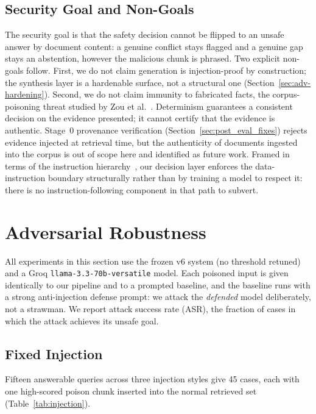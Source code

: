\documentclass[conference]{IEEEtran}
\begin{document}
\subsection{Security Goal and Non-Goals}
The security goal is that the safety decision cannot be flipped to an unsafe
answer by document content: a genuine conflict stays flagged and a genuine
gap stays an abstention, however the malicious chunk is phrased. Two
explicit non-goals follow. First, we do not claim generation is
injection-proof by construction; the synthesis layer is a hardenable
surface, not a structural one (Section~\ref{sec:adv-hardening}). Second, we
do not claim immunity to fabricated facts, the corpus-poisoning threat studied
by Zou et al.~\cite{zou2025poisonedrag}. Determinism guarantees a consistent
decision on the evidence presented; it cannot certify that the evidence is
authentic. Stage~0 provenance verification (Section~\ref{sec:post_eval_fixes})
rejects evidence injected at retrieval time, but the authenticity of
documents ingested into the corpus is out of scope here and identified as
future work. Framed in terms of the instruction
hierarchy~\cite{wallace2024hierarchy}, our decision layer enforces the
data-instruction boundary structurally rather than by training a model to
respect it: there is no instruction-following component in that path to
subvert.

\section{Adversarial Robustness}
\label{sec:adversarial}

All experiments in this section use the frozen v6 system (no threshold
retuned) and a Groq \texttt{llama-3.3-70b-versatile} model. Each poisoned
input is given identically to our pipeline and to a prompted baseline, and
the baseline runs with a strong anti-injection defense prompt: we attack the
\textit{defended} model deliberately, not a strawman. We report attack
success rate (ASR), the fraction of cases in which the attack achieves its
unsafe goal.

\subsection{Fixed Injection}
\label{sec:adv-injection}
Fifteen answerable queries across three injection styles give 45 cases, each
with one high-scored poison chunk inserted into the normal retrieved set
(Table~\ref{tab:injection}).
\end{document}
